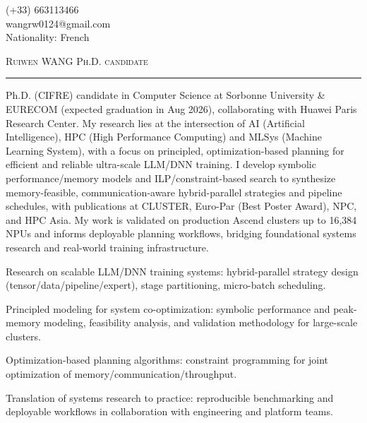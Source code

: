 \documentclass[a4paper,9pt]{article}
\begin{document}
\begin{flushright}
  {\Calluna (+33) 663113466}\\
  {\Calluna wangrw0124@gmail.com}\\
  {\Calluna Nationality: French}
\end{flushright}\vspace{-38pt}

\begin{flushleft}
  {\Calluna \fontsize{30pt}{30pt}\selectfont \textsc{Ruiwen WANG}}
  \quad
  {\Calluna \fontsize{14.5pt}{14.5pt}\selectfont \textsc{Ph.D. candidate}}
  \noindent\rule{\textwidth}{0.4pt}
\end{flushleft}

{
Ph.D. (CIFRE) candidate in Computer Science at Sorbonne University \& EURECOM (expected graduation in Aug 2026), collaborating with Huawei Paris Research Center. My research lies at the intersection of AI (Artificial Intelligence), HPC (High Performance Computing) and MLSys (Machine Learning System), with a focus on principled, optimization-based planning for efficient and reliable ultra-scale LLM/DNN training. I develop symbolic performance/memory models and ILP/constraint-based search to synthesize memory-feasible, communication-aware hybrid-parallel strategies and pipeline schedules, with publications at CLUSTER, Euro-Par (Best Poster Award), NPC, and HPC Asia. My work is validated on production Ascend clusters up to 16,384 NPUs and informs deployable planning workflows, bridging foundational systems research and real-world training infrastructure.
\vspace{-15pt}
}


{
\item Research on scalable LLM/DNN training systems: hybrid-parallel strategy design (tensor/data/pipeline/expert), stage partitioning, micro-batch scheduling.
\item Principled modeling for system co-optimization: symbolic performance and peak-memory modeling, feasibility analysis, and validation methodology for large-scale clusters.
\item Optimization-based planning algorithms: constraint programming for joint optimization of memory/communication/throughput.
\item Translation of systems research to practice: reproducible benchmarking and deployable workflows in collaboration with engineering and platform teams.
\vspace{-15pt}
}
\end{document}
